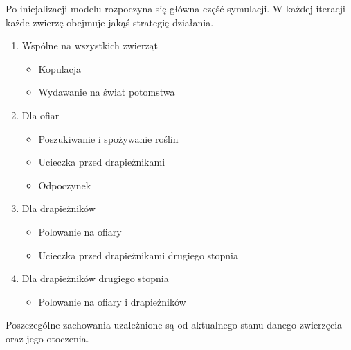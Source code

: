 Po inicjalizacji modelu rozpoczyna się główna część symulacji. W każdej iteracji każde zwierzę obejmuje jakąś strategię działania.
\begin{enumerate}
\item Wspólne na wszystkich zwierząt
	\begin{itemize}
		\item Kopulacja
		\item Wydawanie na świat potomstwa
	\end{itemize}
\item Dla ofiar
	\begin{itemize}
		\item Poszukiwanie i spożywanie roślin
		\item Ucieczka przed drapieżnikami
		\item Odpoczynek
	\end{itemize}
\item Dla drapieżników
	\begin{itemize}
		\item Polowanie na ofiary
		\item Ucieczka przed drapieżnikami drugiego stopnia
	\end{itemize}
\item Dla drapieżników drugiego stopnia
	\begin{itemize}
		\item Polowanie na ofiary i drapieżników
	\end{itemize}
\end{enumerate}

Poszczególne zachowania uzależnione są od aktualnego stanu danego zwierzęcia oraz jego otoczenia.

